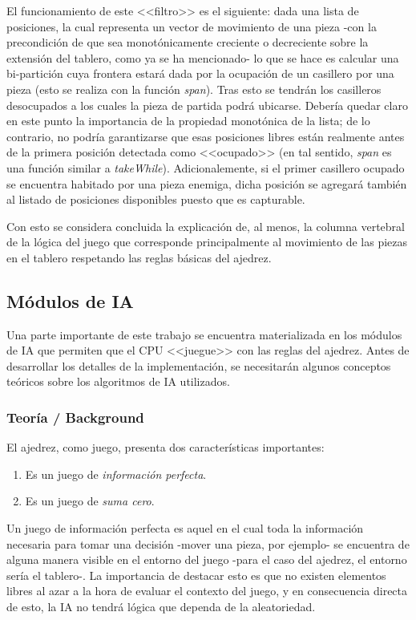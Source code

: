 \documentclass{llncs}
\begin{document}
El funcionamiento de este <<filtro>> es el siguiente: dada una lista de posiciones, la cual representa un vector de movimiento de una pieza -con la precondición de que sea monotónicamente creciente o decreciente sobre la extensión del tablero, como ya se ha mencionado- lo que se hace es calcular una bi-partición cuya frontera estará dada por la ocupación de un casillero por una pieza (esto se realiza con la función \textit{span}).  Tras esto se tendrán los casilleros desocupados a los cuales la pieza de partida podrá ubicarse. Debería quedar claro en este punto la importancia de la propiedad monotónica de la lista; de lo contrario, no podría garantizarse que esas posiciones libres están realmente antes de la primera posición detectada como <<ocupado>> (en tal sentido, \textit{span} es una función similar a \textit{takeWhile}).
Adicionalemente, si el primer casillero ocupado se encuentra habitado por una pieza enemiga, dicha posición se agregará también al listado de posiciones disponibles puesto que es capturable.

Con esto se considera concluida la explicación de, al menos, la columna vertebral de la lógica del juego que corresponde principalmente al movimiento de las piezas en el tablero respetando las reglas básicas del ajedrez.


\subsection{Módulos de IA}

Una parte importante de este trabajo se encuentra materializada en los módulos de IA que permiten que el CPU <<juegue>> con las reglas del ajedrez. Antes de desarrollar los detalles de la implementación, se necesitarán algunos conceptos teóricos sobre los algoritmos de IA utilizados.

\subsubsection{ Teoría / Background }

El ajedrez, como juego, presenta dos características importantes:

\begin{enumerate}
  \item Es un juego de \textit{información perfecta}.
  \item Es un juego de \textit{suma cero}.
\end{enumerate}

Un juego de información perfecta es aquel en el cual toda la información necesaria para tomar una decisión -mover una pieza, por ejemplo- se encuentra de alguna manera visible en el entorno del juego -para el caso del ajedrez, el entorno sería el tablero-. La importancia de destacar esto es que no existen elementos libres al azar a la hora de evaluar el contexto del juego, y en consecuencia directa de esto, la IA no tendrá lógica que dependa de la aleatoriedad.
\end{document}
